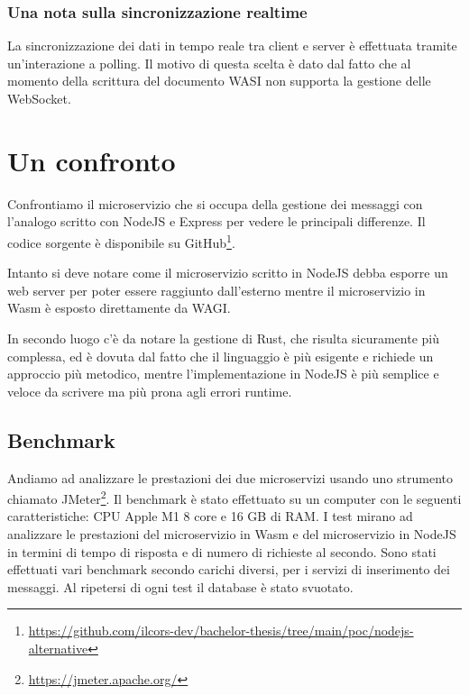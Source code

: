 
\subsubsection{Una nota sulla sincronizzazione realtime}
La sincronizzazione dei dati in tempo reale tra client e server è effettuata tramite un'interazione a polling. Il motivo
di questa scelta è dato dal fatto che al momento della scrittura del documento WASI non supporta la gestione delle
WebSocket.

\section{Un confronto}
Confrontiamo il microservizio che si occupa della gestione dei messaggi con l'analogo scritto con NodeJS e Express per
vedere le principali differenze. Il codice sorgente è disponibile su
GitHub\footnote{\url{https://github.com/ilcors-dev/bachelor-thesis/tree/main/poc/nodejs-alternative}}.

Intanto si deve notare come il microservizio scritto in NodeJS debba esporre un web server per poter essere raggiunto
dall'esterno mentre il microservizio in Wasm è esposto direttamente da WAGI.

In secondo luogo c'è da notare la gestione di Rust, che risulta sicuramente più complessa, ed è dovuta dal fatto che il
linguaggio è più esigente e richiede un approccio più metodico, mentre l'implementazione in NodeJS è più semplice e
veloce da scrivere ma più prona agli errori runtime.

\subsection{Benchmark}
Andiamo ad analizzare le prestazioni dei due microservizi usando uno strumento chiamato
JMeter\footnote{\url{https://jmeter.apache.org/}}. Il benchmark è stato effettuato su un computer con le seguenti
caratteristiche: CPU Apple M1 8 core e 16 GB di RAM. I test mirano ad analizzare le prestazioni del microservizio in
Wasm e del microservizio in NodeJS in termini di tempo di risposta e di numero di richieste al secondo. Sono stati
effettuati vari benchmark secondo carichi diversi, per i servizi di inserimento dei messaggi. Al ripetersi di ogni test
il database è stato svuotato.

